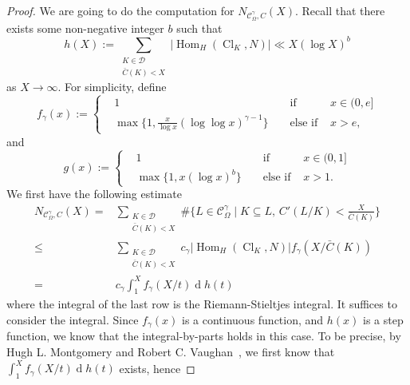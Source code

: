 \documentclass[12pt,a4paper]{amsart}
\numberwithin{equation}{section}%
\theoremstyle{plain}%
\theoremstyle{definition}%
\theoremstyle{remark}%
\begin{document}
    \begin{proof}
    	We are going to do the computation for $N_{\mathcal{C}_{\Omega}^{\gamma},C}(X)$.
    	Recall that there exists some non-negative integer $b$ such that
    	\begin{equation*}
    		h(X):=\sum_{
    			\substack{
    				K\in\mathcal{D}\\
    				\bar{C}(K)<X
    			}
    		}\lvert\operatorname{Hom}_{H}(\operatorname{Cl}_{K},N)\rvert\ll X(\log X)^{b}
    	\end{equation*}
    	as $X\to\infty$.
    	For simplicity, define 
    	\begin{equation*}
    		f_{\gamma}(x):=\left\{\begin{aligned}
    			&1& &\text{ if }& x\in(0,e] \\
    			&\max\{1,\frac{x}{\log x}(\log\log x)^{\gamma-1}\}& &\text{ else if }& x>e,
    		\end{aligned}\right.
    	\end{equation*}
    	and
    	\begin{equation*}
    		g(x):=\left\{\begin{aligned}
    			&1& &\text{ if }& x\in(0,1] \\
    			&\max\{1,x(\log x)^{b}\}& &\text{ else if }& x>1.
    		\end{aligned}\right.
    	\end{equation*}
    	We first have the following estimate
    	\begin{align*}
    		N_{\mathcal{C}_{\Omega}^{\gamma},C}(X)
    		=&\sum_{
    			\substack{
    				K\in\mathcal{D}\\
    				\bar{C}(K)<X
    			}
    		}\#\{L\in\mathcal{C}_{\Omega}^{\gamma}\mid K\subseteq L,\, C'(L/K)<\frac{X}{\bar{C}(K)}\} \\
    		\leq & \sum_{
    			\substack{
    				K\in\mathcal{D}\\
    				\bar{C}(K)<X
    			}
    		}c_{\gamma}\lvert\operatorname{Hom}_{H}(\operatorname{Cl}_{K},N)\rvert f_{\gamma}(X/\bar{C}(K)) \\
    		=&c_{\gamma}\int_{1}^{X}f_{\gamma}(X/t)\operatorname{d}h(t)
    	\end{align*}
    	where the integral of the last row is the Riemann-Stieltjes integral.
    	It suffices to consider the integral.  
    	Since $f_{\gamma}(x)$ is a continuous function, and $h(x)$ is a step function, we know that the integral-by-parts holds in this case.
    	To be precise, by Hugh L. Montgomery and Robert C. Vaughan~\cite[Theorem A.1 and A.2]{montgomery2006multiplicative}, we first know that $\int_{1}^{X}f_{\gamma}(X/t)\operatorname{d}h(t)$ exists, hence

\end{proof}
\end{document}
